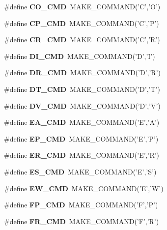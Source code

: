 \begin{CompactItemize}
\item 
\#define \textbf{CO\_\-CMD}~MAKE\_\-COMMAND('C','O')\label{hpgsreader_8h_f27a4b2633fff72e19ff94548a9b80df}

\item 
\#define \textbf{CP\_\-CMD}~MAKE\_\-COMMAND('C','P')\label{hpgsreader_8h_020935f8642573a342d5a719dfa539aa}

\item 
\#define \textbf{CR\_\-CMD}~MAKE\_\-COMMAND('C','R')\label{hpgsreader_8h_2cc9d18b4fb56992239116e98636c937}

\item 
\#define \textbf{DI\_\-CMD}~MAKE\_\-COMMAND('D','I')\label{hpgsreader_8h_0af849564d5f967cb1a2939a60716735}

\item 
\#define \textbf{DR\_\-CMD}~MAKE\_\-COMMAND('D','R')\label{hpgsreader_8h_816e86a2c3fced4d09433f3a84f2fcc7}

\item 
\#define \textbf{DT\_\-CMD}~MAKE\_\-COMMAND('D','T')\label{hpgsreader_8h_93853a2689d035c7c4dc2097e8e3840d}

\item 
\#define \textbf{DV\_\-CMD}~MAKE\_\-COMMAND('D','V')\label{hpgsreader_8h_3cf7d74c1419fd9a739999372fbe107b}

\item 
\#define \textbf{EA\_\-CMD}~MAKE\_\-COMMAND('E','A')\label{hpgsreader_8h_e57c4b954849c48758f6e1ad1d9cf467}

\item 
\#define \textbf{EP\_\-CMD}~MAKE\_\-COMMAND('E','P')\label{hpgsreader_8h_cd4fcdfc4e6dbfb398b37828554a6132}

\item 
\#define \textbf{ER\_\-CMD}~MAKE\_\-COMMAND('E','R')\label{hpgsreader_8h_a84400acb77816daef666ab03fc1d95d}

\item 
\#define \textbf{ES\_\-CMD}~MAKE\_\-COMMAND('E','S')\label{hpgsreader_8h_d14bc6ae8f5dc14439025f4154685c50}

\item 
\#define \textbf{EW\_\-CMD}~MAKE\_\-COMMAND('E','W')\label{hpgsreader_8h_05ccbfd46ce9c97f6918862c018a26a5}

\item 
\#define \textbf{FP\_\-CMD}~MAKE\_\-COMMAND('F','P')\label{hpgsreader_8h_01ad494f6c0ccf72b446e2a7ff1343fe}

\item 
\#define \textbf{FR\_\-CMD}~MAKE\_\-COMMAND('F','R')\label{hpgsreader_8h_a2c9b1dc809a17b6e0b1c5aa30861c56}


\end{CompactItemize}
